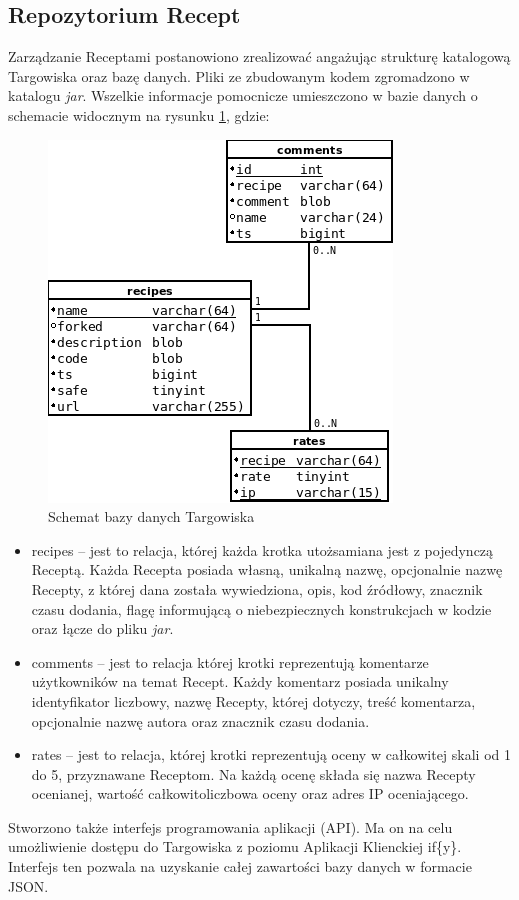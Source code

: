 \documentclass[11pt,a4paper,polish,thesis]{dcsbook}
\begin{document}
\subsection{Repozytorium Recept}
Zarządzanie Receptami postanowiono zrealizować angażując strukturę katalogową Targowiska oraz bazę danych. Pliki ze zbudowanym kodem zgromadzono w katalogu \emph{jar}.
Wszelkie informacje pomocnicze umieszczono w bazie danych o schemacie widocznym na rysunku \ref{fig:market_db}, gdzie:
\begin{figure}[H]
  \centering
  \includegraphics[scale=0.7]{./resources/market_db.png}
  \caption{Schemat bazy danych Targowiska}
  \label{fig:market_db}
\end{figure}
\begin{itemize}
\item recipes -- jest to relacja, której każda krotka utożsamiana jest z pojedynczą Receptą. Każda Recepta posiada własną, unikalną nazwę, opcjonalnie nazwę Recepty,
z której dana została wywiedziona, opis, kod źródłowy, znacznik czasu dodania, flagę informującą o niebezpiecznych konstrukcjach w kodzie oraz łącze do pliku
\emph{jar}.
\item comments -- jest to relacja której krotki reprezentują komentarze użytkowników na temat Recept. Każdy komentarz posiada unikalny identyfikator liczbowy, nazwę
Recepty, której dotyczy, treść komentarza, opcjonalnie nazwę autora oraz znacznik czasu dodania.
\item rates -- jest to relacja, której krotki reprezentują oceny w całkowitej skali od 1 do 5, przyznawane Receptom. Na każdą ocenę składa się nazwa Recepty ocenianej,
wartość całkowitoliczbowa oceny oraz adres IP oceniającego.
\end{itemize}
Stworzono także interfejs programowania aplikacji (API). Ma on na celu umożliwienie dostępu do Targowiska z poziomu Aplikacji Klienckiej if\{y\}. Interfejs ten
pozwala na uzyskanie całej zawartości bazy danych w formacie JSON.
\end{document}
